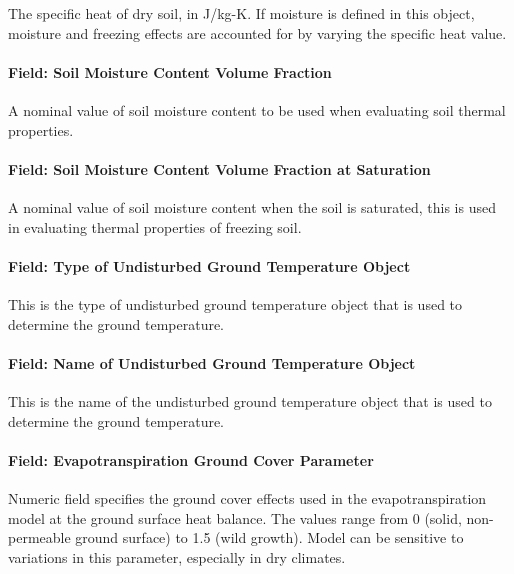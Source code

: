 The specific heat of dry soil, in J/kg-K. If moisture is defined in this object, moisture and freezing effects are accounted for by varying the specific heat value.

\paragraph{Field: Soil Moisture Content Volume Fraction}\label{field-soil-moisture-content-volume-fraction-2}

A nominal value of soil moisture content to be used when evaluating soil thermal properties.

\paragraph{Field: Soil Moisture Content Volume Fraction at Saturation}\label{field-soil-moisture-content-volume-fraction-at-saturation-2}

A nominal value of soil moisture content when the soil is saturated, this is used in evaluating thermal properties of freezing soil.

\paragraph{Field: Type of Undisturbed Ground Temperature Object}\label{field-type-of-undisturbed-ground-temperature-object-1-000}

This is the type of undisturbed ground temperature object that is used to determine the ground temperature.

\paragraph{Field: Name of Undisturbed Ground Temperature Object}\label{field-name-of-undisturbed-ground-temperature-object-1-000}

This is the name of the undisturbed ground temperature object that is used to determine the ground temperature.

\paragraph{Field: Evapotranspiration Ground Cover Parameter}\label{field-evapotranspiration-ground-cover-parameter-2}

Numeric field specifies the ground cover effects used in the evapotranspiration model at the ground surface heat balance. The values range from 0 (solid, non-permeable ground surface) to 1.5 (wild growth). Model can be sensitive to variations in this parameter, especially in dry climates.

